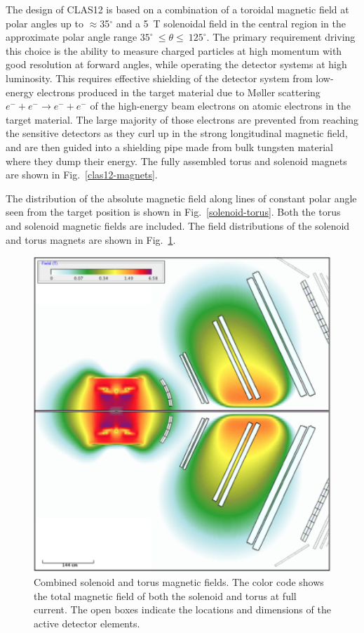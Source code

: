 \documentclass[final,3p]{elsarticle}
\begin{document}
\begin{twocolumn}
The design of CLAS12 is based on a combination of a toroidal magnetic field at polar angles up to $\approx$35$^\circ$
and a 5~T solenoidal field in the central region in the approximate polar angle range $35^\circ~\le \theta \le~125^\circ$.
The primary requirement driving this choice is the ability to measure charged particles at high momentum with good
resolution at forward angles, while operating the detector systems at high luminosity. This requires effective
shielding of the detector system from low-energy electrons produced in the target material due to M{\o}ller
scattering $e^- + e^- \to e^- + e^-$ of the high-energy beam electrons on atomic electrons in the target material.
The large majority of those electrons are prevented from reaching the sensitive detectors as they curl up in the
strong longitudinal magnetic field, and are then guided into a shielding pipe made from bulk tungsten material where
they dump their energy. The fully assembled torus and solenoid magnets are shown in Fig.~\ref{clas12-magnets}.

The distribution of the absolute magnetic field along lines of constant polar angle seen from the target position is
shown in Fig.~\ref{solenoid-torus}. Both the torus and solenoid magnetic fields are included. The field distributions 
of the solenoid and torus magnets are shown in Fig.~\ref{stray-field}.  

\begin{figure}[th!]
\centerline{\includegraphics[width=0.9\columnwidth]{magfield-2.png}}
\caption{Combined solenoid and torus magnetic fields. The color code shows the total magnetic field of both the
  solenoid and torus at full current. The open boxes indicate the locations and dimensions of the active detector
  elements.}
\label{stray-field}
\end{figure}


\end{twocolumn}
\end{document}
